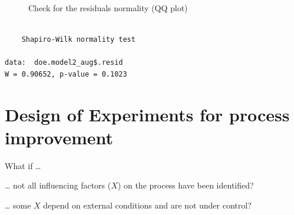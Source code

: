 \documentclass[
  a4paper,
]{scrbook}
\newenvironment{Shaded}{\begin{snugshade}}{\end{snugshade}}
\newcommand{\FunctionTok}[1]{\textcolor[rgb]{0.28,0.35,0.67}{#1}}
\newcommand{\NormalTok}[1]{\textcolor[rgb]{0.00,0.23,0.31}{#1}}
\newcommand{\SpecialCharTok}[1]{\textcolor[rgb]{0.37,0.37,0.37}{#1}}
\begin{document}
\begin{figure}[ht]


\caption{\label{fig-pd-resid-qq}Check for the residuals normality (QQ
plot)}

\end{figure}%

\begin{Shaded}
\end{Shaded}

\begin{verbatim}

    Shapiro-Wilk normality test

data:  doe.model2_aug$.resid
W = 0.90652, p-value = 0.1023
\end{verbatim}

\section{Design of Experiments for process
improvement}\label{design-of-experiments-for-process-improvement}

What if \ldots{}

\ldots{} not all influencing factors (\(X\)) on the process have been
identified?

\ldots{} some \(X\) depend on external conditions and are not under
control?
\end{document}
